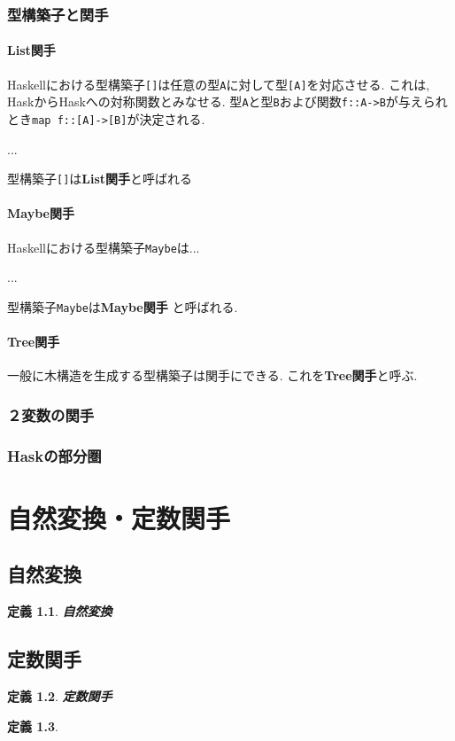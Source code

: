 \documentclass{jsbook}
\theoremstyle{plain}
\newtheorem{Def}{定義}[chapter]
\begin{document}
\subsection{型構築子と関手}
\subsubsection{List関手}
Haskellにおける型構築子\verb|[]|は任意の型\verb|A|に対して型\verb|[A]|を対応させる.
これは, HaskからHaskへの対称関数とみなせる.
型\verb|A|と型\verb|B|および関数\verb|f::A->B|が与えられとき\verb|map f::[A]->[B]|が決定される.

...

型構築子\verb|[]|は{\bf List関手}と呼ばれる
\subsubsection{Maybe関手}
Haskellにおける型構築子\verb|Maybe|は...

...

型構築子\verb|Maybe|は{\bf Maybe関手}
と呼ばれる.
\subsubsection{Tree関手}
一般に木構造を生成する型構築子は関手にできる. これを{\bf Tree関手}と呼ぶ.


\subsection{２変数の関手}
\subsection{Haskの部分圏}
\chapter{自然変換・定数関手}
\section{自然変換}
\begin{Def}
{\bf 自然変換}
\end{Def}
\section{定数関手}
\begin{Def}
{\bf 定数関手}
\end{Def}
\begin{Def}
\end{Def}
\end{document}
